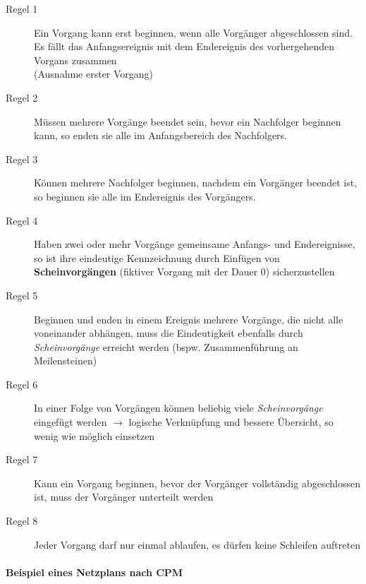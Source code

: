 \documentclass[a4paper]{article}
\begin{document}
			\begin{description}
				\item[Regel 1] Ein Vorgang kann erst beginnen, wenn alle Vorgänger abgeschlossen sind.
						Es fällt das Anfangsereignis mit dem Endereignis des vorhergehenden Vorgans zusammen\\ (Ausnahme erster Vorgang)
						
				\item[Regel 2] Müssen mehrere Vorgänge beendet sein, bevor ein Nachfolger beginnen kann, so enden sie alle im Anfangsbereich des Nachfolgers.
				
				\item[Regel 3] Können mehrere Nachfolger beginnen, nachdem ein Vorgänger beendet ist, so beginnen sie alle im Endereignis des Vorgängers.
				
				\item[Regel 4] Haben zwei oder mehr Vorgänge gemeinsame Anfangs- und Endereignisse, so ist ihre eindeutige Kennzeichnung durch Einfügen von \textbf{Scheinvorgängen} (fiktiver Vorgang mit der Dauer 0) sicherzustellen
				
				\item[Regel 5] Beginnen und enden in einem Ereignis mehrere Vorgänge, die nicht alle voneinander abhängen, muss die Eindeutigkeit ebenfalls durch \textit{Scheinvorgänge} erreicht werden (bspw. Zusammenführung an Meilensteinen)
				
				\item[Regel 6]  In einer Folge von Vorgängen können beliebig viele \textit{Scheinvorgänge} eingefügt werden $\rightarrow$ logische Verknüpfung und bessere Übersicht, so wenig wie möglich einsetzen
				
				\item[Regel 7] Kann ein Vorgang beginnen, bevor der Vorgänger vollständig abgeschlossen ist, muss der Vorgänger unterteilt werden
				
				\item[Regel 8] Jeder Vorgang darf nur einmal ablaufen, es dürfen keine Schleifen auftreten
			\end{description}
			
			\paragraph{Beispiel eines Netzplans nach CPM}
			
\end{document}
